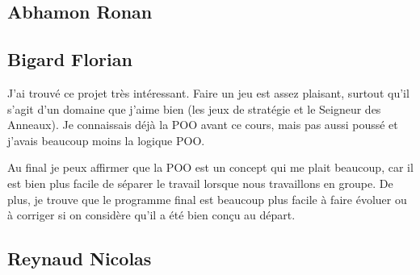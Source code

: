 \documentclass{article}
\begin{document}
\subsection{Abhamon Ronan}

\subsection{Bigard Florian}
J'ai trouvé ce projet très intéressant. 
Faire un jeu est assez plaisant, surtout qu'il s'agit d'un domaine que j'aime bien (les jeux de stratégie et le Seigneur des Anneaux).
Je connaissais déjà la POO avant ce cours, mais pas aussi poussé et j'avais beaucoup moins la logique POO. 

Au final je peux affirmer que la POO est un concept qui me plait beaucoup, car il est bien plus facile de séparer le travail lorsque nous travaillons en groupe.
De plus, je trouve que le programme final est beaucoup plus facile à faire évoluer ou à corriger si on considère qu'il a été bien conçu au départ. 

\subsection{Reynaud Nicolas}
\end{document}
